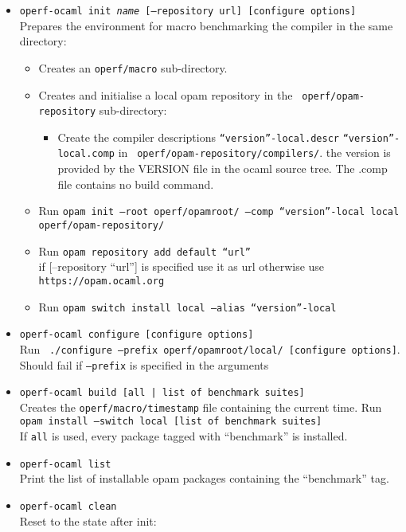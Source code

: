 \documentclass[11pt,a4paper]{article}
\begin{document}
\begin{itemize}
\item {\tt operf-ocaml init {\em name} [--repository url] [configure options]}\\
  Prepares the environment for macro benchmarking the
  compiler in the same directory:
  \begin{itemize}
  \item Creates an {\tt operf/macro} sub-directory.
  \item Creates and initialise a local opam repository in the {\tt
    operf/opam-repository} sub-directory:
    \begin{itemize}
    \item Create the compiler descriptions {\tt ``version''-local.descr}
      {\tt ``version''-local.comp} in {\tt
        operf/opam-repository/compilers/}.  the version is provided by
      the VERSION file in the ocaml source tree. The .comp file
      contains no build command.
    \end{itemize}
  \item Run {\tt opam init --root operf/opamroot/ --comp
    ``version''-local local operf/opam-repository/}
  \item Run {\tt opam repository add default ``url''}\\ if
    [--repository ``url''] is specified use it as url otherwise use
    {\tt https://opam.ocaml.org}
  \item Run {\tt opam switch install local --alias ``version''-local}
  \end{itemize}
\item {\tt operf-ocaml configure [configure options]}\\ Run {\tt
  ./configure --prefix operf/opamroot/local/ [configure
    options]}. Should fail if {\tt --prefix} is specified in the
  arguments
\item {\tt operf-ocaml build [all | list of benchmark suites]}\\
  Creates the {\tt operf/macro/timestamp} file containing the
  current time.
  Run {\tt opam install --switch local [list of benchmark
      suites]}\\ If {\tt all} is used, every package tagged with
  ``benchmark'' is installed.
\item {\tt operf-ocaml list}\\ Print the list of installable opam
  packages containing the ``benchmark'' tag.
\item {\tt operf-ocaml clean}\\ Reset to the state after init:\\

\end{itemize}
\end{document}
